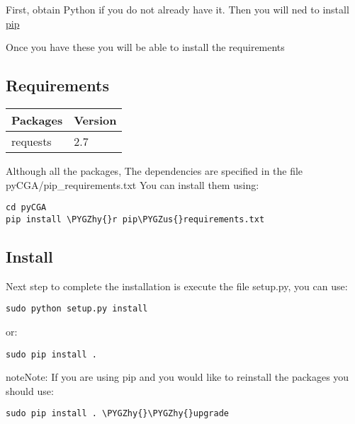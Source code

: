 \documentclass[letterpaper,10pt,english]{sphinxmanual}
\def\PYGZus{\char`\_}
\def\PYGZhy{\char`\-}
\begin{document}
First, obtain Python if you do not already have it. Then you will ned to install \href{https://pip.pypa.io/en/latest/installing.html}{pip}

Once you have these you will be able to install the requirements


\subsection{Requirements}
\label{installation:requirements}
\begin{tabulary}{\linewidth}{|L|L|}
\hline
\textsf{\relax 
Packages
} & \textsf{\relax 
Version
}\\
\hline
requests
 & 
2.7
\\
\hline\end{tabulary}


Although all the packages, The dependencies are specified in the file pyCGA/pip\_requirements.txt
You can install them using:

\begin{Verbatim}[commandchars=\\\{\}]
cd pyCGA
pip install \PYGZhy{}r pip\PYGZus{}requirements.txt
\end{Verbatim}


\subsection{Install}
\label{installation:install}
Next step to complete the installation is execute the file setup.py, you can use:

\begin{Verbatim}[commandchars=\\\{\}]
sudo python setup.py install
\end{Verbatim}

or:

\begin{Verbatim}[commandchars=\\\{\}]
sudo pip install .
\end{Verbatim}

\begin{notice}{note}{Note:}
If you are using pip and you would like to reinstall the packages you should use:

\begin{Verbatim}[commandchars=\\\{\}]
sudo pip install . \PYGZhy{}\PYGZhy{}upgrade
\end{Verbatim}
\end{notice}
\end{document}
